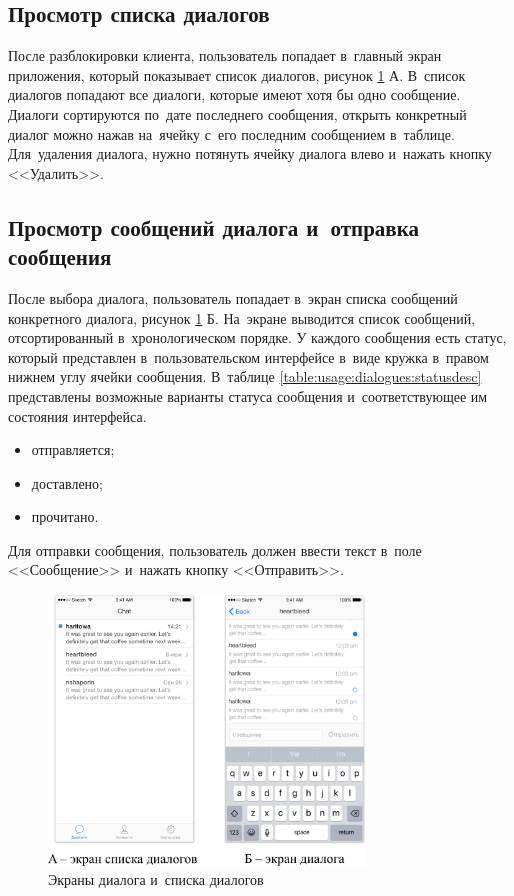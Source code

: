 \subsection{Просмотр списка диалогов}
\label{sec:usage:dialogues}

После разблокировки клиента, пользователь попадает в~главный экран приложения, который показывает список диалогов, рисунок \ref{sec:usage:dialogues:ui} А. В~список диалогов попадают все диалоги, которые имеют хотя бы одно сообщение. Диалоги сортируются по~дате последнего сообщения, открыть конкретный диалог можно нажав на~ячейку с~его последним сообщением в~таблице. Для~удаления диалога, нужно потянуть ячейку диалога влево и~нажать кнопку <<Удалить>>.

\subsection{Просмотр сообщений диалога и~отправка сообщения}
\label{sec:usage:dialogue}

После выбора диалога, пользователь попадает в~экран списка сообщений конкретного диалога, рисунок \ref{sec:usage:dialogues:ui} Б. На~экране выводится список сообщений, отсортированный в~хронологическом порядке. У каждого сообщения есть статус, который представлен в~пользовательском интерфейсе в~виде кружка в~правом нижнем углу ячейки сообщения. В~таблице \ref{table:usage:dialogues:statusdesc} представлены возможные варианты статуса сообщения и~соответствующее им состояния интерфейса.

\begin{itemize}
	\item отправляется;
	\item доставлено;
	\item прочитано.
\end{itemize}

Для отправки сообщения, пользователь должен ввести текст в~поле <<Сообщение>> и~нажать кнопку <<Отправить>>.

\begin{figure}[h]
  \centering
    \includegraphics[width=0.75\textwidth]{inc/img/ui/dialogue.jpg}
  \caption{Экраны диалога и~списка диалогов}
  \label{sec:usage:dialogues:ui}
\end{figure}

